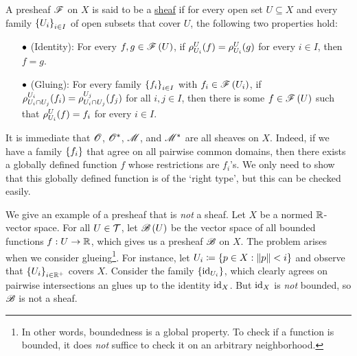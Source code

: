 \documentclass[../Moduli_Spaces_of_Riemann_Surfaces.tex]{subfiles}
\begin{document}
    \begin{definition}
        A presheaf $\mathscr{F}$ on $X$ is said to be a \ul{sheaf} if for every open set $U\subseteq X$ and every family $\left\{U_i\right\}_{i\in I}$ of open subsets that cover $U$, the following two properties hold:
        \begin{itemize}
            \item[$\bullet$] (Identity): For every $f,g\in\mathscr{F}\left(U\right)$, if $\rho^U_{U_i}\!\left(f\right)=\rho^U_{U_i}\!\left(g\right)$ for every $i\in I$, then $f=g$.
                \vspace{-0.1in}
            \item[$\bullet$] (Gluing): For every family $\left\{f_i\right\}_{i\in I}$ with $f_i\in\mathscr{F}\left(U_i\right)$, if $\rho^{U_i}_{U_i\cap U_j}\!\left(f_i\right)=\rho^{U_j}_{U_i\cap U_j}\!\left(f_j\right)$ for all $i,j\in I$, then there is some $f\in\mathscr{F}\left(U\right)$ such that $\rho^U_{U_i}\!\left(f\right)=f_i$ for every $i\in I$.
        \end{itemize}
    \end{definition}
    \begin{example}
        It is immediate that $\mathscr{O}$, $\mathscr{O}^\ast$, $\mathscr{M}$, and $\mathscr{M}^\ast$ are all sheaves on $X$. Indeed, if we have a family $\left\{f_i\right\}$ that agree on all pairwise common domains, then there exists a globally defined function $f$ whose restrictions are $f_i$'s. We only need to show that this globally defined function is of the `right type', but this can be checked easily.\exqed
    \end{example}
    \begin{example}
        We give an example of a presheaf that is \textit{not} a sheaf. Let $X$ be a normed $\mathbb{R}$-vector space. For all $U\in\mathcal{T}$, let $\mathscr{B}\left(U\right)$ be the vector space of all bounded functions $f:U\to\mathbb{R}$, which gives us a presheaf $\mathscr{B}$ on $X$. The problem arises when we consider glueing\footnote{In other words, boundedness is a global property. To check if a function is bounded, it does \textit{not} suffice to check it on an arbitrary neighborhood.}. For instance, let $U_i\coloneqq\left\{p\in X:\left\|p\right\|<i\right\}$ and observe that $\left\{U_i\right\}_{i\in\mathbb{R}^+}$ covers $X$. Consider the family $\left\{\operatorname{id}_{U_i}\right\}$, which clearly agrees on pairwise intersections an glues up to the identity $\operatorname{id}_X$. But $\operatorname{id}_X$ is \textit{not} bounded, so $\mathscr{B}$ is not a sheaf.\exqed
    \end{example}
\end{document}
